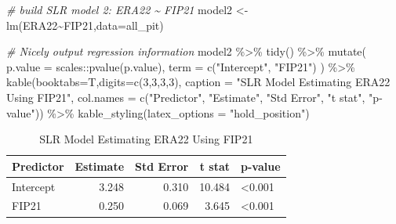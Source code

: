 \documentclass[
  11pt,
]{book}
\newenvironment{Shaded}{\begin{snugshade}}{\end{snugshade}}
\newcommand{\AttributeTok}[1]{\textcolor[rgb]{0.77,0.63,0.00}{#1}}
\newcommand{\CommentTok}[1]{\textcolor[rgb]{0.56,0.35,0.01}{\textit{#1}}}
\newcommand{\DecValTok}[1]{\textcolor[rgb]{0.00,0.00,0.81}{#1}}
\newcommand{\FunctionTok}[1]{\textcolor[rgb]{0.00,0.00,0.00}{#1}}
\newcommand{\NormalTok}[1]{#1}
\newcommand{\OtherTok}[1]{\textcolor[rgb]{0.56,0.35,0.01}{#1}}
\newcommand{\SpecialCharTok}[1]{\textcolor[rgb]{0.00,0.00,0.00}{#1}}
\newcommand{\StringTok}[1]{\textcolor[rgb]{0.31,0.60,0.02}{#1}}
\theoremstyle{definition}
\theoremstyle{definition}
\theoremstyle{definition}
\theoremstyle{definition}
\theoremstyle{remark}
\begin{document}
\newpage

\begin{Shaded}
\begin{Highlighting}[]
\CommentTok{\# build SLR model 2: ERA22 \textasciitilde{} FIP21}
\NormalTok{model2 }\OtherTok{\textless{}{-}} \FunctionTok{lm}\NormalTok{(ERA22}\SpecialCharTok{\textasciitilde{}}\NormalTok{FIP21,}\AttributeTok{data=}\NormalTok{all\_pit)}

\CommentTok{\# Nicely output regression information}
\NormalTok{model2 }\SpecialCharTok{\%\textgreater{}\%} \FunctionTok{tidy}\NormalTok{() }\SpecialCharTok{\%\textgreater{}\%}
  \FunctionTok{mutate}\NormalTok{(}
    \AttributeTok{p.value =}\NormalTok{ scales}\SpecialCharTok{::}\FunctionTok{pvalue}\NormalTok{(p.value),}
    \AttributeTok{term =} \FunctionTok{c}\NormalTok{(}\StringTok{"Intercept"}\NormalTok{, }\StringTok{"FIP21"}\NormalTok{)}
\NormalTok{  ) }\SpecialCharTok{\%\textgreater{}\%}
  \FunctionTok{kable}\NormalTok{(}\AttributeTok{booktabs=}\NormalTok{T,}\AttributeTok{digits=}\FunctionTok{c}\NormalTok{(}\DecValTok{3}\NormalTok{,}\DecValTok{3}\NormalTok{,}\DecValTok{3}\NormalTok{,}\DecValTok{3}\NormalTok{), }
        \AttributeTok{caption =} \StringTok{"SLR Model Estimating ERA22 Using FIP21"}\NormalTok{,}
        \AttributeTok{col.names =} \FunctionTok{c}\NormalTok{(}\StringTok{"Predictor"}\NormalTok{, }\StringTok{"Estimate"}\NormalTok{, }\StringTok{"Std Error"}\NormalTok{, }\StringTok{"t stat"}\NormalTok{, }\StringTok{"p{-}value"}\NormalTok{)) }\SpecialCharTok{\%\textgreater{}\%}
  \FunctionTok{kable\_styling}\NormalTok{(}\AttributeTok{latex\_options =} \StringTok{"hold\_position"}\NormalTok{)}
\end{Highlighting}
\end{Shaded}

\begin{table}[!h]

\caption{\label{tab:unnamed-chunk-189}SLR Model Estimating ERA22 Using FIP21}
\centering
\begin{tabular}[t]{lrrrl}
\toprule
Predictor & Estimate & Std Error & t stat & p-value\\
\midrule
Intercept & 3.248 & 0.310 & 10.484 & <0.001\\
FIP21 & 0.250 & 0.069 & 3.645 & <0.001\\
\bottomrule
\end{tabular}
\end{table}
\end{document}
